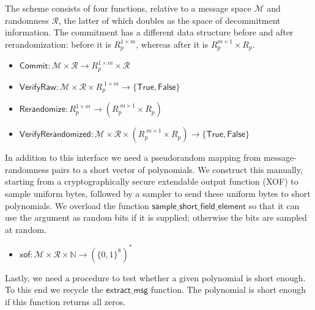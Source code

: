The scheme consists of four functions, relative to a message space $\mathcal{M}$ and randomness $\mathcal{R}$, the latter of which doubles as the space of decommitment information. The commitment has a different data structure before and after rerandomization: before it is $R_p^{1 \times m}$, whereas after it is $R_p^{m \times 1} \times R_p$.
\begin{itemize}
\item $\mathsf{Commit} : \mathcal{M} \times \mathcal{R} \rightarrow R_p^{1 \times m} \times \mathcal{R}$
\item $\mathsf{VerifyRaw} : \mathcal{M} \times \mathcal{R} \times R_p^{\phantom{\vert}1 \times m} \rightarrow \{\mathsf{True},\mathsf{False}\}$
\item $\mathsf{Rerandomize} : R_p^{1 \times m} \rightarrow (R_p^{\phantom{\vert}m \times 1} \times R_p)$
\item $\mathsf{VerifyRerandomized} : \mathcal{M} \times \mathcal{R} \times (R_p^{\phantom{\vert}m \times 1} \times R_p) \rightarrow \{\mathsf{True},\mathsf{False}\}$
\end{itemize}
In addition to this interface we need a pseudorandom mapping from message-randomness pairs to a short vector of polynomials. We construct this manually, starting from a cryptographically secure extendable output function (XOF) to sample uniform bytes, followed by a sampler to send these uniform bytes to short polynomials. We overload the function $\mathsf{sample\_short\_field\_element}$ so that it can use the argument as random bits if it is supplied; otherwise the bits are sampled at random.
\begin{itemize}
\item $\mathsf{xof} : \mathcal{M} \times \mathcal{R} \times \mathbb{N} \rightarrow (\{0, 1\}^8)^*$
\end{itemize}
Lastly, we need a procedure to test whether a given polynomial is short enough. To this end we recycle the $\mathsf{extract\_msg}$ function. The polynomial is short enough if this function returns all zeros.

